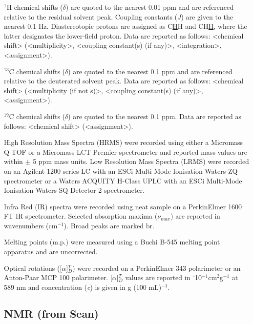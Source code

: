 $^1$H chemical shifts ($\delta$) are quoted to the nearest 0.01 ppm and are referenced relative to the residual solvent peak\cite{Gottlieb1997}. Coupling constants (\textit{J}) are given to the nearest 0.1 Hz. Diastereotopic protons are assigned as C\underline{H}H and CH\underline{H},
where the latter designates the lower‑field proton. Data are reported as follows: <chemical shift> (<multiplicity>, <coupling constant(s) (if any)>, <integration>, <assignment>).

$^{13}$C chemical shifts ($\delta$) are quoted to the nearest 0.1 ppm and are referenced relative to the deuterated solvent peak\cite{Gottlieb1997}. Data are reported as follows: <chemical shift> (<multiplicity (if not s)>, <coupling constant(s) (if any)>, <assignment>).

$^{19}$C chemical shifts ($\delta$) are quoted to the nearest 0.1 ppm. Data are reported as follows: <chemical shift> (<assignment>).

High Resolution Mass Spectra (HRMS) were recorded using either a Micromass Q-TOF or a Micromass LCT Premier spectrometer and reported mass values are within $\pm$ 5 ppm mass units. Low Resolution Mass Spectra (LRMS) were recorded on an Agilent 1200 series LC with an ESCi Multi-Mode Ionisation Waters ZQ spectrometer or a Waters ACQUITY H-Class UPLC with an ESCi Multi-Mode Ionisation Waters SQ Detector 2 spectrometer.

Infra Red (IR) spectra were recorded using neat sample on a PerkinElmer 1600 FT IR spectrometer. Selected absorption maxima ($\nu_{max}$) are reported in wavenumbers (cm$^{-1}$). Broad peaks are marked br.

Melting points (m.p.) were measured using a Buchi B-545 melting point apparatus and are uncorrected. 

Optical rotations ([$\alpha$]$_D^T$) were recorded on a PerkinElmer 343 polarimeter or an Anton-Paar MCP 100 polarimeter. [$\alpha$]$_D^T$ values are reported in $^{\circ}$10$^{-1}$cm$^2$g$^{-1}$ at 589 nm and concentration (\textit{c}) is given in g (100 mL)$^{-1}$. 

\subsection{NMR (from Sean)}

